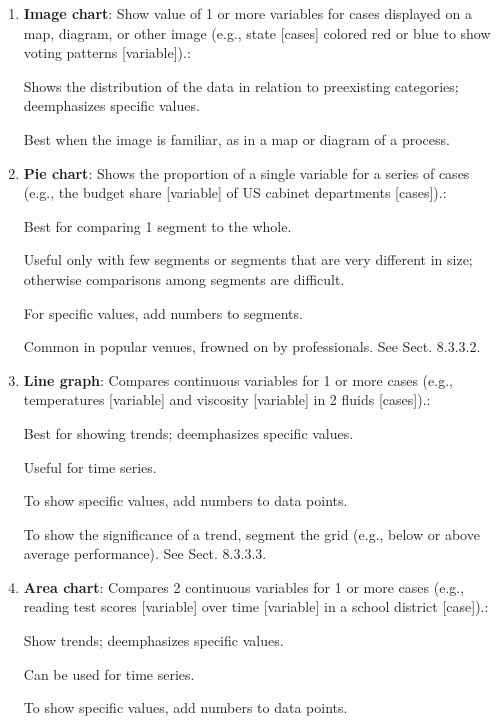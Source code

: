 \documentclass[oneside]{book}
\numberwithin{equation}{section}
\begin{document}
\begin{enumerate}
    Best for comparing segments within continuous data sets.
    
    Show trends but emphasizes segments (e.g., a sudden spike at \$5--10,000 representing part-time workers).
    
    For specific values, add numbers to bars.
    \item \textbf{Image chart}: Show value of 1 or more variables for cases displayed on a map, diagram, or other image (e.g., state [cases] colored red or blue to show voting patterns [variable]).:
    
    Shows the distribution of the data in relation to preexisting categories; deemphasizes specific values.
    
    Best when the image is familiar, as in a map or diagram of a process.
    \item \textbf{Pie chart}: Shows the proportion of a single variable for a series of cases (e.g., the budget share [variable] of US cabinet departments [cases]).:
    
    Best for comparing 1 segment to the whole.
    
    Useful only with few segments or segments that are very different in size; otherwise comparisons among segments are difficult.
    
    For specific values, add numbers to segments.
    
    Common in popular venues, frowned on by professionals. See Sect. 8.3.3.2.
    \item \textbf{Line graph}: Compares continuous variables for 1 or more cases (e.g., temperatures [variable] and viscosity [variable] in 2 fluids [cases]).:
    
    Best for showing trends; deemphasizes specific values.
    
    Useful for time series.
    
    To show specific values, add numbers to data points.
    
    To show the significance of a trend, segment the grid (e.g., below or above average performance). See Sect. 8.3.3.3.
    \item \textbf{Area chart}:  Compares 2 continuous variables for 1 or more cases (e.g., reading test scores [variable] over time [variable] in a school district [case]).:
    
    Show trends; deemphasizes specific values.
    
    Can be used for time series.
    
    To show specific values, add numbers to data points.
    

\end{enumerate}
\end{document}
